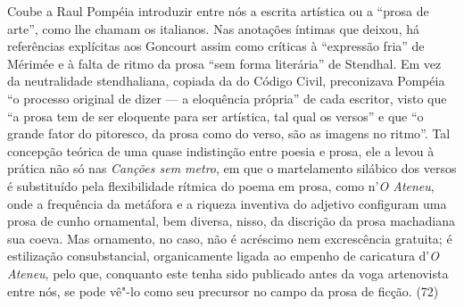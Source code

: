 Coube a Raul Pompéia introduzir entre nós a escrita
artística ou a ``prosa de arte'', como lhe chamam os italianos. Nas
anotações íntimas que deixou, há referências explícitas aos Goncourt
assim como críticas à ``expressão fria'' de Mérimée e à falta de ritmo
da prosa ``sem forma literária'' de Stendhal. Em vez da neutralidade
stendhaliana, copiada da do Código Civil, preconizava Pompéia ``o
processo original de dizer --- a eloquência própria'' de cada escritor,
visto que ``a prosa tem de ser eloquente para ser artística, tal qual os
versos'' e que ``o grande fator do pitoresco, da prosa como do verso, são
as imagens no ritmo''. Tal concepção teórica de uma quase indistinção 
entre poesia e prosa, ele a levou à prática não só nas
\textit{Canções sem metro}, em que o
martelamento silábico dos versos é substituído pela flexibilidade
rítmica do poema em prosa, como n'\textit{O Ateneu}, 
onde a frequência da metáfora e a riqueza
inventiva do adjetivo configuram uma prosa de cunho ornamental, bem
diversa, nisso, da discrição da prosa machadiana sua coeva. Mas
ornamento, no caso, não é acréscimo nem excrescência gratuita; é
estilização consubstancial, organicamente ligada ao empenho de
caricatura d'\textit{O Ateneu}, pelo que,
conquanto este tenha sido publicado antes da voga artenovista entre
nós, se pode vê"-lo como seu precursor no campo da prosa de ficção.
(72)



